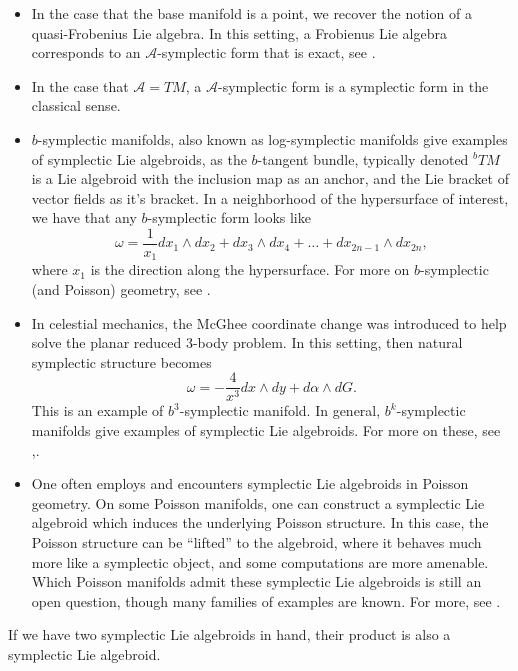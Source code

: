 \documentclass{amsart}
\newcommand{\A}{\mathcal{A}}
\theoremstyle{definition}
\begin{document}
\begin{itemize}
    \item In the case that the base manifold is a point, we recover the notion of a quasi-Frobenius Lie algebra. In this setting, a Frobienus Lie algebra corresponds to an $\A$-symplectic form that is exact, see \cite[Chapter 3.1]{MR1300632}.
    \item In the case that $\A=TM$, a $\A$-symplectic form is a symplectic form in the classical sense.
    \item $b$-symplectic manifolds, also known as log-symplectic manifolds give examples of symplectic Lie algebroids, as the $b$-tangent bundle, typically denoted ${}^bTM$ is a Lie algebroid with the inclusion map as an anchor, and the Lie bracket of vector fields as it's bracket. In a neighborhood of the hypersurface of interest, we have that any $b$-symplectic form looks like
    \begin{equation*}
        \omega = \frac{1}{x_1}dx_1 \wedge dx_2 +dx_3 \wedge dx_4 + \dots + dx_{2n-1} \wedge dx_{2n}, 
    \end{equation*}
    where $x_1$ is the direction along the hypersurface. For more on $b$-symplectic (and Poisson) geometry, see \cite{Guillemin_2014}.
    \item In celestial mechanics, the McGhee coordinate change was introduced \cite{McGehee1974} to help solve the planar reduced 3-body problem. In this setting, then natural symplectic structure becomes
    \begin{equation*}
        \omega = - \frac{4}{x^3}dx \wedge dy + d\alpha \wedge dG.
    \end{equation*}
    This is an example of $b^3$-symplectic manifold. In general, $b^k$-symplectic manifolds give examples of symplectic Lie algebroids. For more on these, see \cite{scott2013geometrybkmanifolds},\cite{Guillemin2017}.
    \item One often employs and encounters symplectic Lie algebroids in Poisson geometry. On some Poisson manifolds, one can construct a symplectic Lie algebroid which induces the underlying Poisson structure. In this case, the Poisson structure can be ``lifted'' to the algebroid, where it behaves much more like a symplectic object, and some computations are more amenable. Which Poisson manifolds admit these symplectic Lie algebroids is still an open question, though many families of examples are known. For more, see \cite{braddell2017invitationsingularsymplecticgeometry}.
\end{itemize}
If we have two symplectic Lie algebroids in hand, their product is also a symplectic Lie algebroid.
\end{document}
